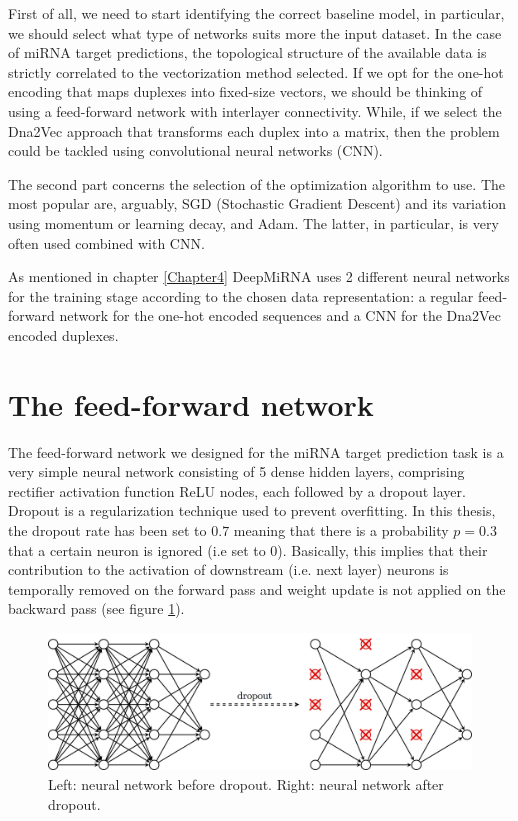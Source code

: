 First of all, we need to start identifying the correct baseline model, in particular, we should select what type of networks suits more the input dataset. In the case of miRNA target predictions, the topological structure of the available data is strictly correlated to the vectorization method selected. If we opt for the one-hot encoding that maps duplexes into fixed-size vectors, we should be thinking of using a feed-forward network with interlayer connectivity. While, if we select the Dna2Vec approach that transforms each duplex into a matrix, then the problem could be tackled using convolutional neural networks (CNN)\cite{dl}.  

The second part concerns the selection of the optimization algorithm to use. The most popular are, arguably, SGD (Stochastic Gradient Descent) and its variation using momentum or learning decay, and Adam. The latter, in particular, is very often used combined with CNN.

As mentioned in chapter \ref{Chapter4} DeepMiRNA uses 2 different neural networks for the training stage according to the chosen data representation: a regular feed-forward network for the one-hot encoded sequences and a CNN for the Dna2Vec encoded duplexes. 

\section{The feed-forward network} 
The feed-forward network we designed for the miRNA target prediction task is a very simple neural network consisting of 5 dense hidden layers, comprising rectifier activation function ReLU nodes, each followed by a dropout layer. Dropout \cite{dropout} is a regularization technique used to prevent overfitting. In this thesis, the dropout rate has been set to $0.7$ meaning that there is a probability $p = 0.3$ that a certain neuron is ignored (i.e set to 0). Basically, this implies that their contribution to the activation of downstream (i.e. next layer) neurons is temporally removed on the forward pass and weight update is not applied on the backward pass (see figure \ref{fig:dropout}).

\begin{figure}[hbt!]
	\centering
	\includegraphics[width=\textwidth, height=0.3\textheight]{Figures/dropout}
	\caption{Left: neural network before dropout. Right: neural network after dropout.}
	\label{fig:dropout}
\end{figure}   

